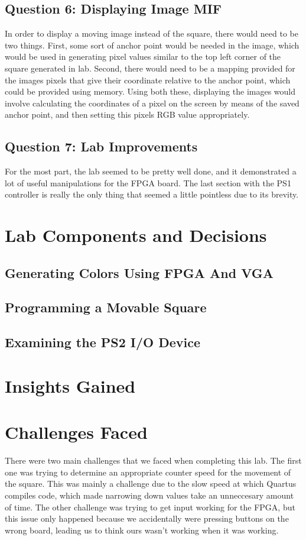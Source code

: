 \documentclass[letterpaper]{article} %
\begin{document}
    \subsection{Question 6: Displaying Image MIF}
        In order to display a moving image instead of the square, there would need to be two things. First, some sort of anchor point would be needed in the image, which would be used in generating pixel values similar to the top left corner of the square generated in lab. Second, there would need to be a mapping provided for the images pixels that give their coordinate relative to the anchor point, which could be provided using memory. Using both these, displaying the images would involve calculating the coordinates of a pixel on the screen by means of the saved anchor point, and then setting this pixels RGB value appropriately.
        
    \subsection{Question 7: Lab Improvements}
        For the most part, the lab seemed to be pretty well done, and it demonstrated a lot of useful manipulations for the FPGA board. The last section with the PS1 controller is really the only thing that seemed a little pointless due to its brevity.
\section{Lab Components and Decisions}
    \subsection{Generating Colors Using FPGA And VGA}

    \subsection{Programming a Movable Square}

    \subsection{Examining the PS2 I/O Device}

\section{Insights Gained}

\section{Challenges Faced}
    There were two main challenges that we faced when completing this lab. The first one was trying to determine an appropriate counter speed for the movement of the square. This was mainly a challenge due to the slow speed at which Quartus compiles code, which made narrowing down values take an unneccesary amount of time. The other challenge was trying to get input working for the FPGA, but this issue only happened because we accidentally were pressing buttons on the wrong board, leading us to think ours wasn't working when it was working.
\end{document}

